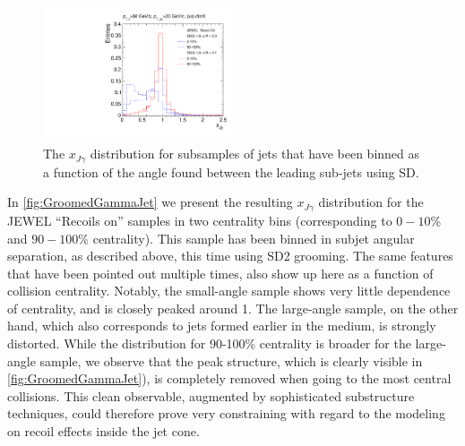 \begin{figure}[th]
\centering
\includegraphics[width=0.5\textwidth]
{figures/Observables_GammaJet/JEWEL-photon-jet-recoilOn-linear}%
\caption{The $x_{J\gamma}$ distribution for subsamples of jets that have been binned as a function of the angle found between the leading sub-jets using SD. }
\label{fig:GroomedGammaJet}
\end{figure}
In \autoref{fig:GroomedGammaJet} we present the resulting $x_{J\gamma}$ distribution for the JEWEL ``Recoils on'' samples in two centrality bins (corresponding to $0-10$\% and $90-100$\% centrality). This sample has been binned in subjet angular separation, as described above, this time using SD2 grooming. The same features that have been pointed out multiple times, also show up here as a function of collision centrality. Notably, the small-angle sample shows very little dependence of centrality, and is closely peaked around 1. The large-angle sample, on the other hand, which also corresponds to jets formed earlier in the medium, is strongly distorted. While the distribution for  90-100\% centrality is broader for the large-angle sample, we observe that the peak structure, which is clearly visible in \autoref{fig:GroomedGammaJet}), is completely removed when going to the most central collisions. This clean observable, augmented by sophisticated substructure techniques, could therefore prove very constraining with regard to the modeling on recoil effects inside the jet cone.

